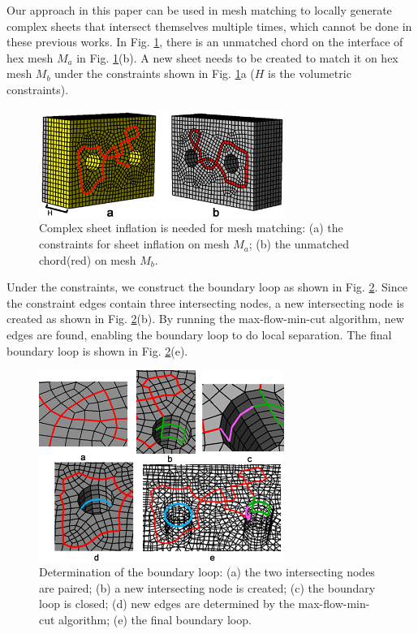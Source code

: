 \documentclass[final,5p,times,twocolumn]{elsarticle}
\begin{document}
Our approach in this paper can be used in mesh matching to locally generate complex sheets that intersect themselves multiple times, which cannot be done in these previous works. In Fig. \ref{fig:exam1_input}, there is an unmatched chord on the interface of hex mesh $M_a$ in Fig. \ref{fig:exam1_input}(b). A new sheet needs to be created to match it on hex mesh $M_b$ under the constraints shown in Fig. \ref{fig:exam1_input}a ($H$ is the volumetric constraints).

\begin{figure}[htbp]
\begin{center}
\includegraphics[width=8cm]{figures/exam1_input.png}
\caption{Complex sheet inflation is needed for mesh matching: (a) the constraints for sheet inflation on mesh $M_a$; (b) the unmatched chord(red) on mesh $M_b$.}
\label{fig:exam1_input}
\end{center}
\end{figure}

Under the constraints, we construct the boundary loop as shown in Fig. \ref{fig:exam1_bound_loop}. Since the constraint edges contain three intersecting nodes, a new intersecting node is created as shown in Fig. \ref{fig:exam1_bound_loop}(b). By running the max-flow-min-cut algorithm, new edges are found, enabling the boundary loop to do local separation. The final boundary loop is shown in Fig. \ref{fig:exam1_bound_loop}(e).

\begin{figure}[htbp]
\begin{center}
\includegraphics[width=8cm]{figures/exam1_bound_loop.png}
\caption{Determination of the boundary loop: (a) the two intersecting nodes are paired; (b) a new intersecting node is created; (c) the boundary loop is closed; (d) new edges are determined by the max-flow-min-cut algorithm; (e) the final boundary loop.}
\label{fig:exam1_bound_loop}
\end{center}
\end{figure}
\end{document}
